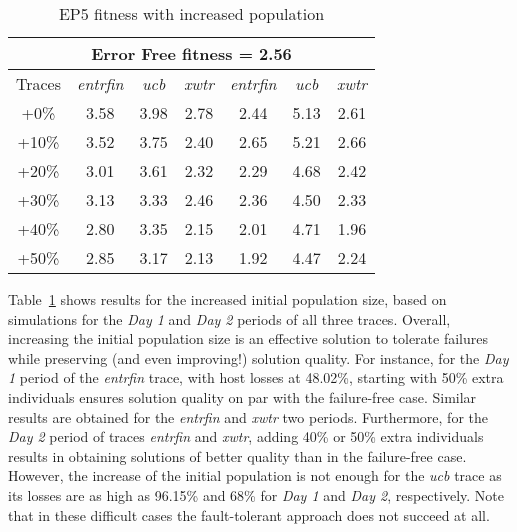 \documentclass[graybox]{sty/svmult}
\begin{document}
\begin{table}[h]
    \caption{EP5 fitness with increased population}
\begin{center}
    \begin{tabular}{|c|c|c|c|c|c|c|}
        \hline
        \multicolumn{7}{|c|}{Error Free fitness = 2.56} \\
        \hline
        \hline Traces  & \emph{entrfin} & \emph{ucb} & \emph{xwtr} & \emph{entrfin} & \emph{ucb} & \emph{xwtr}\\
        \hline +0\%    & 3.58 & 3.98 & 2.78 &  2.44 & 5.13 & 2.61   \\
        \hline +10\%   & 3.52 & 3.75 & 2.40 &  2.65 & 5.21 & 2.66   \\
        \hline +20\%   & 3.01 & 3.61 & 2.32 &  2.29 & 4.68 & 2.42   \\ 
        \hline +30\%   & 3.13 & 3.33 & 2.46 &  2.36 & 4.50 & 2.33   \\
        \hline +40\%   & 2.80 & 3.35 & 2.15 &  2.01 & 4.71 & 1.96   \\ 
        \hline +50\%   & 2.85 & 3.17 & 2.13 &  1.92 & 4.47 & 2.24   \\
        \hline
    \end{tabular}
\end{center}
    \label{tab:parity5-fitness-pct}
\end{table}

Table~\ref{tab:parity5-fitness-pct} shows results for the increased
initial population size, based on simulations for the \emph{Day 1}
and \emph{Day 2} periods of all three traces.  Overall, increasing the
initial population size is an effective solution to tolerate failures
while preserving (and even improving!) solution quality. For instance,
for the \emph{Day 1} period of the \emph{entrfin} trace, with host losses
at 48.02\%, starting with 50\% extra individuals ensures solution quality
on par with the failure-free case.  Similar results are obtained for the
\emph{entrfin} and \emph{xwtr} two periods. Furthermore, for the \emph{Day
2} period of traces \emph{entrfin} and \emph{xwtr}, adding 40\% or 50\%
extra individuals results in obtaining solutions of better quality than in
the failure-free case. However, the increase of the initial population is
not enough for the \emph{ucb} trace as its losses are as high as 96.15\%
and 68\% for \emph{Day 1} and \emph{Day 2}, respectively. Note that in these
difficult cases the fault-tolerant approach does not succeed at all.
\end{document}
